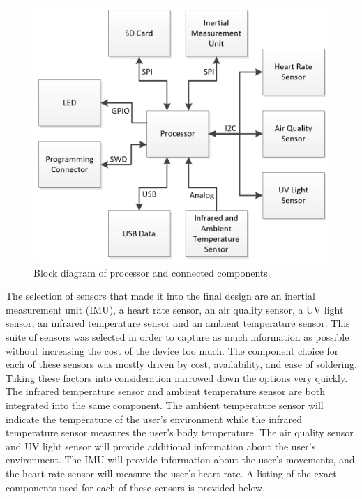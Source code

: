 \begin{figure}[!htb]
\centering
\includegraphics[width=\textwidth]{images/BlockDiagram_Processor.png}
\caption{Block diagram of processor and connected components.}
\label{fig:BlockDiagram_Processor}
\end{figure}

The selection of sensors that made it into the final design are an inertial 
measurement unit (IMU), a heart rate sensor, an air quality sensor, a UV light 
sensor, an infrared temperature sensor and an ambient temperature sensor. This 
suite of sensors was selected in order to capture as much information as 
possible without increasing the cost of the device too much. The component 
choice for each of these sensors was mostly driven by cost, availability, and 
ease of soldering. Taking these factors into consideration narrowed down the 
options very quickly. The infrared temperature sensor and ambient temperature 
sensor are both integrated into the same component. The ambient temperature 
sensor will indicate the temperature of the user’s environment while the 
infrared temperature sensor measures the user’s body temperature. The air 
quality sensor and UV light sensor will provide additional information about 
the user’s environment. The IMU will provide information about the user’s 
movements, and the heart rate sensor will measure the user’s heart rate. A 
listing of the exact components used for each of these sensors is provided 
below.

